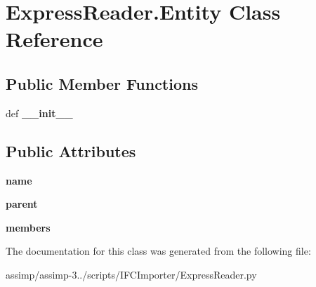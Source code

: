 \hypertarget{class_express_reader_1_1_entity}{\section{Express\+Reader.\+Entity Class Reference}
\label{class_express_reader_1_1_entity}
}
\subsection*{Public Member Functions}
\begin{DoxyCompactItemize}
\item 
\hypertarget{class_express_reader_1_1_entity_a16c0bf3f8631048a077997f430bdaccf}{def {\bfseries \+\_\+\+\_\+init\+\_\+\+\_\+}}\label{class_express_reader_1_1_entity_a16c0bf3f8631048a077997f430bdaccf}

\end{DoxyCompactItemize}
\subsection*{Public Attributes}
\begin{DoxyCompactItemize}
\item 
\hypertarget{class_express_reader_1_1_entity_a59602468563282268ae5e7bda5e26378}{{\bfseries name}}\label{class_express_reader_1_1_entity_a59602468563282268ae5e7bda5e26378}

\item 
\hypertarget{class_express_reader_1_1_entity_a588a87b24530eee66eafb0943e4a8c07}{{\bfseries parent}}\label{class_express_reader_1_1_entity_a588a87b24530eee66eafb0943e4a8c07}

\item 
\hypertarget{class_express_reader_1_1_entity_ac5ea294d8c22e4665ac9f9bdb5ef55da}{{\bfseries members}}\label{class_express_reader_1_1_entity_ac5ea294d8c22e4665ac9f9bdb5ef55da}

\end{DoxyCompactItemize}


The documentation for this class was generated from the following file\+:\begin{DoxyCompactItemize}
\item 
assimp/assimp-\/3../scripts/\+I\+F\+C\+Importer/Express\+Reader.\+py\end{DoxyCompactItemize}
